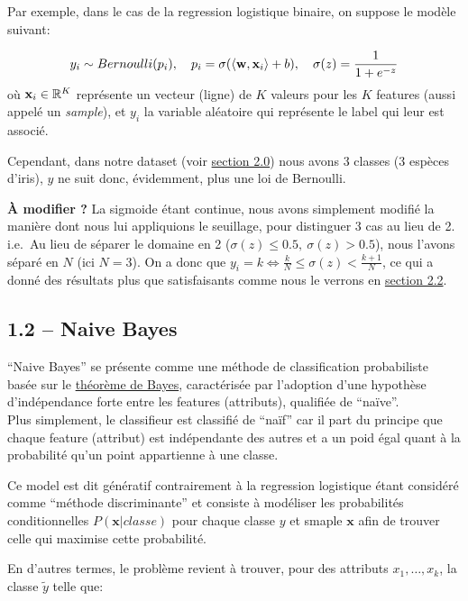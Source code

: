 \documentclass[
]{article}
\begin{document}
Par exemple, dans le cas de la regression logistique binaire, on suppose
le modèle suivant:

\[
y_i \sim Bernoulli(p_i),\quad p_i = \sigma(\langle \mathbf{w}, \mathbf{x}_i \rangle + b),\quad \sigma(z) = \frac{1}{1 + e^{-z}}
\] où \(\mathbf{x}_i \in \mathbb{R}^K\) représente un vecteur (ligne) de \(K\)
valeurs pour les \(K\) features (aussi appelé un \emph{sample}), et
\(y_i\) la variable aléatoire qui représente le label qui leur est
associé.

Cependant, dans notre dataset (voir
\href{#choix-du-dataset-outils-utilisuxe9s}{section 2.0}) nous avons 3
classes (3 espèces d'iris), \(y\) ne suit donc, évidemment, plus une loi
de Bernoulli.

\textbf{À modifier ?} La sigmoide étant continue, nous avons simplement
modifié la manière dont nous lui appliquions le seuillage, pour
distinguer 3 cas au lieu de 2. i.e.~Au lieu de séparer le domaine en 2
(\(\sigma(z) \leq 0.5,\ \sigma(z) > 0.5\)), nous l'avons séparé en \(N\)
(ici \(N = 3\)). On a donc que
\(y_i = k \Leftrightarrow \frac{k}{N} \leq \sigma(z) < \frac{k + 1}{N}\),
ce qui a donné des résultats plus que satisfaisants comme nous le
verrons en \href{#ruxe9gression-logistique-1}{section 2.2}.

\subsection{1.2 -- Naive Bayes}\label{naive-bayes}

``Naive Bayes'' se présente comme une méthode de classification
probabiliste basée sur le
\href{https://en.wikipedia.org/wiki/Bayes\%27_theorem}{théorème de
Bayes}, caractérisée par l'adoption d'une hypothèse d'indépendance forte
entre les features (attributs), qualifiée de ``naïve''.\\
Plus simplement, le classifieur est classifié de ``naïf'' car il part du
principe que chaque feature (attribut) est indépendante des autres et a
un poid égal quant à la probabilité qu'un point appartienne à une
classe.

Ce model est dit génératif contrairement à la regression logistique
étant considéré comme ``méthode discriminante''
\cite{ClassifieurLineaire2022} et consiste à modéliser les probabilités
conditionnelles \(P(\mathbf{x}| classe)\) pour chaque classe \(y\) et
smaple \(\mathbf{x}\) afin de trouver celle qui maximise cette
probabilité.

En d'autres termes, le problème revient à trouver, pour des attributs
\(x_1, \ldots, x_k\), la classe \(\tilde{y}\) telle que:
\end{document}
